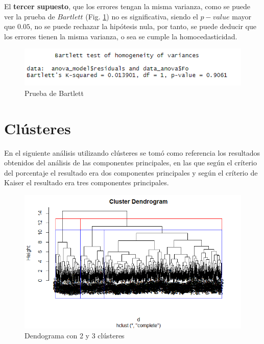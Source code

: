 \documentclass[a4paper,10pt,twocolumn]{article}
\begin{document}
El \textbf{tercer supuesto}, que los errores tengan la misma varianza, como se puede ver la prueba de $Bartlett$ (Fig. \ref{fig:anova_homo}) no es significativa, siendo el $p-value$ mayor que $0.05$, no se puede rechazar la hipótesis nula, por tanto, se puede deducir que los errores tienen la misma varianza, o sea se cumple la homocedasticidad.

\begin{figure}[htb]%
	\begin{center}
		\includegraphics[width=\linewidth]{anova_homo}
	\end{center}
	\caption{Prueba de Bartlett \label{fig:anova_homo}}%
\end{figure}

\section{Clústeres}\label{sec:clusters}

En el siguiente análisis utilizando clústeres se tomó como referencia los resultados obtenidos del análisis de las componentes principales, en las que según el críterio del porcentaje el resultado era dos componentes principales y según el críterio de Kaiser el resultado era tres componentes principales.

\begin{figure}[htb]%
	\begin{center}
		\includegraphics[width=\linewidth]{dendogram_2_3}
	\end{center}
	\caption{Dendograma con 2 y 3 clústeres \label{fig:dendogram_2_3}}%
\end{figure}
\end{document}
